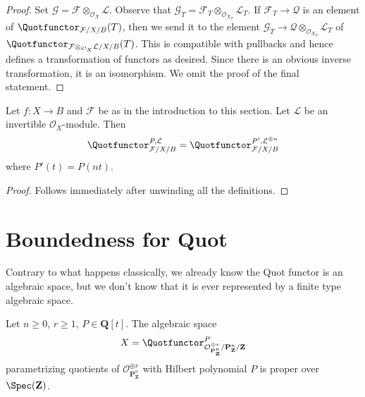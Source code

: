 \begin{proof}
Set $\mathcal{G} = \mathcal{F} \otimes_{\mathcal{O}_X} \mathcal{L}$.
Observe that
$\mathcal{G}_T = \mathcal{F}_T \otimes_{\mathcal{O}_{X_T}} \mathcal{L}_T$.
If $\mathcal{F}_T \to \mathcal{Q}$ is an element of
$\Quotfunctor_{\mathcal{F}/X/B}(T)$, then we send it
to the element
$\mathcal{G}_T \to \mathcal{Q} \otimes_{\mathcal{O}_{X_T}} \mathcal{L}_T$
of
$\Quotfunctor_{\mathcal{F} \otimes_{\mathcal{O}_X} \mathcal{L}/X/B}(T)$.
This is compatible with pullbacks and hence
defines a transformation of functors as desired.
Since there is an obvious inverse transformation,
it is an isomorphism. We omit the proof of the final statement.
\end{proof}

\begin{lemma}
\label{lemma-quot-power-invertible}
Let $f : X \to B$ and $\mathcal{F}$ be as in the introduction to this section.
Let $\mathcal{L}$ be an invertible $\mathcal{O}_X$-module.
Then
$$
\Quotfunctor^{P, \mathcal{L}}_{\mathcal{F}/X/B} =
\Quotfunctor^{P', \mathcal{L}^{\otimes n}}_{\mathcal{F}/X/B}
$$
where $P'(t) = P(nt)$.
\end{lemma}

\begin{proof}
Follows immediately after unwinding all the definitions.
\end{proof}






\section{Boundedness for Quot}
\label{section-quot-bounded}

\noindent
Contrary to what happens classically, we already know the Quot
functor is an algebraic space, but we don't know that it is
ever represented by a finite type algebraic space.

\begin{lemma}
\label{lemma-quot-Pn}
Let $n \geq 0$, $r \geq 1$, $P \in \mathbf{Q}[t]$.
The algebraic space
$$
X = \Quotfunctor^P_{\mathcal{O}^{\oplus r}_{\mathbf{P}^n_\mathbf{Z}}/
\mathbf{P}^n_\mathbf{Z}/\mathbf{Z}}
$$
parametrizing quotients of $\mathcal{O}_{\mathbf{P}^n_\mathbf{Z}}^{\oplus r}$
with Hilbert polynomial $P$ is proper over $\Spec(\mathbf{Z})$.
\end{lemma}


